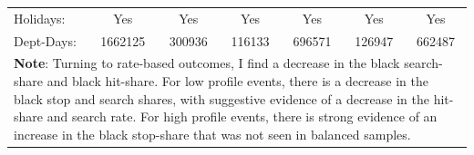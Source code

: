 \begin{tabular}{l*{6}{c}}
Holidays:   &         Yes         &         Yes         &         Yes         &         Yes         &         Yes         &         Yes         \\
Dept-Days:  &     1662125         &      300936         &      116133         &      696571         &      126947         &      662487         \\
\hline \multicolumn{7}{p{\linewidth}}{\textbf{Note}: Turning to rate-based outcomes, I find a decrease in the black search-share and black hit-share. For low profile events, there is a decrease in the black stop and search shares, with suggestive evidence of a decrease in the hit-share and search rate. For high profile events, there is strong evidence of an increase in the black stop-share that was not seen in balanced samples.} \\ \hline \end{tabular}

